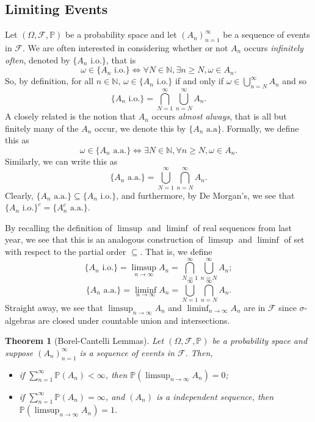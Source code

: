 \documentclass[
]{article}
\newtheorem{theorem}{Theorem}
\theoremstyle{definition}
\begin{document}
\hypertarget{limiting-events}{%
\subsection{Limiting Events}\label{limiting-events}}

Let \((\Omega, \mathcal{F}, \mathbb{P})\) be a probability space and let
\((A_n)_{n = 1}^\infty\) be a sequence of events in \(\mathcal{F}\). We
are often interested in considering whether or not \(A_n\) occurs
\emph{infinitely often}, denoted by \(\{A_n \text{ i.o.}\}\), that is
\[\omega \in \{A_n \text{ i.o.}\} \iff \forall N \in \mathbb{N}, 
  \exists n \ge N, \omega \in A_n.\] So, by definition, for all
\(n \in \mathbb{N}\), \(\omega \in \{A_n \text{ i.o.}\}\) if and only if
\(\omega \in \bigcup_{n = N}^\infty A_n\) and so
\[\{A_n \text{ i.o.}\} = \bigcap_{N = 1}^\infty \bigcup_{n = N}^\infty A_n.\]
A closely related is the notion that \(A_n\) occurs \emph{almost
always}, that is all but finitely many of the \(A_n\) occur, we denote
this by \(\{A_n \text{ a.a}\}\). Formally, we define this as
\[\omega \in \{A_n \text{ a.a.}\} \iff \exists N \in \mathbb{N}, 
  \forall n \ge N, \omega \in A_n.\] Similarly, we can write this as
\[\{A_n \text{ a.a.}\} = \bigcup_{N = 1}^\infty \bigcap_{n = N}^\infty A_n.\]
Clearly, \(\{A_n \text{ a.a.}\} \subseteq \{A_n \text{ i.o.}\}\), and
furthermore, by De Morgan's, we see that
\(\{A_n \text{ i.o.}\}^c = \{A_n^c \text{ a.a.}\}\).

By recalling the definition of \(\limsup\) and \(\liminf\) of real
sequences from last year, we see that this is an analogous construction
of \(\limsup\) and \(\liminf\) of set with respect to the partial order
\(\subseteq\). That is, we define
\[\{A_n \text{ i.o.}\} = \limsup_{n \to \infty} A_n = 
  \bigcap_{N = 1}^\infty \bigcup_{n = N}^\infty A_n;\]
\[\{A_n \text{ a.a.}\} = \liminf_{n \to \infty} A_n =
  \bigcup_{N = 1}^\infty \bigcap_{n = N}^\infty A_n.\] Straight away, we
see that \(\limsup_{n \to \infty} A_n\) and
\(\liminf_{n \to \infty} A_n\) are in \(\mathcal{F}\) since
\(\sigma\)-algebras are closed under countable union and intersections.

\begin{theorem}[Borel-Cantelli Lemmas]
  Let \((\Omega, \mathcal{F}, \mathbb{P})\) be a probability space and suppose 
  \((A_n)_{n = 1}^\infty\) is a sequence of events in \(\mathcal{F}\). Then, 
  \begin{itemize}
    \item if \(\sum_{n = 1}^\infty \mathbb{P}(A_n) < \infty\), then 
      \(\mathbb{P}(\limsup_{n \to \infty} A_n) = 0\);
    \item if \(\sum_{n = 1}^\infty \mathbb{P}(A_n) = \infty\), and \((A_n)\) is 
      a independent sequence, then \(\mathbb{P}(\limsup_{n \to \infty} A_n) = 1\).
  \end{itemize}
\end{theorem}
\proof
\end{document}
